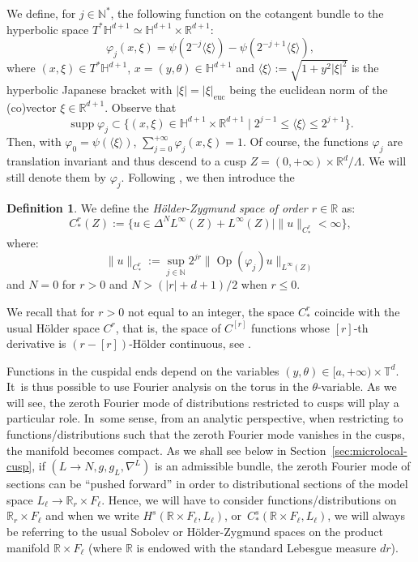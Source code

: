 \documentclass[10pt]{amsart}
\newcommand{\R}{\mathbb{R}}
\newcommand{\T}{\mathbb{T}}
\newcommand{\N}{\mathbb{N}}
\newcommand{\HH}{\mathbb{H}}
\DeclareMathOperator{\Op}{Op}
\DeclareMathOperator{\supp}{supp}
\theoremstyle{plain}
\theoremstyle{definition}
\newtheorem{definition}{Definition}[section]
\begin{document}
We define, for $j \in \N^\ast$, the following function on the cotangent bundle to the hyperbolic space $T^* \HH^{d+1} \simeq \HH^{d+1}\times \R^{d+1}$:
\begin{equation}
\label{equation:definition-phi-j}
\varphi_j(x,\xi) = \psi(2^{-j}\langle \xi \rangle)-\psi(2^{-j+1}\langle \xi \rangle),
\end{equation}
where $(x,\xi) \in T^*\HH^{d+1}$, $x = (y,\theta) \in \HH^{d+1}$ and $\langle \xi \rangle := \sqrt{1 + y^2|\xi|^2}$ is the hyperbolic Japanese bracket with $|\xi| = |\xi|_{\mathrm{euc}}$ being the euclidean norm of the (co)vector $\xi \in \R^{d+1}$. Observe that
\[
\supp \varphi_j \subset \bigl\{ (x,\xi) \in \HH^{d+1} \times \R^{d+1} \mid 2^{j-1} \leq \langle \xi \rangle \leq 2^{j+1}\bigr\}.
\]
Then, with $\varphi_0 = \psi(\langle \xi\rangle)$, $\sum_{j=0}^{+\infty} \varphi_j(x,\xi) = 1$. Of course, the functions $\varphi_j$ are translation invariant and thus descend to a cusp $Z = (0,+\infty) \times \R^d/\Lambda$. We will still denote them by $\varphi_j$. Following \cite[Def.\,3.1]{Bonthonneau-Lefeuvre-19-1}, we then introduce the

\begin{definition}
We define the \emph{Hölder-Zygmund space of order $r \in \R$} as:
\[
C^r_*(Z) := \bigl\{ u \in \Delta^N L^\infty(Z)+L^\infty(Z)\mid \|u\|_{C^r_*} < \infty \bigr\},
\]
where:
\[
\|u\|_{C^r_*} := \sup_{j \in \N} 2^{jr} \|\Op(\varphi_j)u\|_{L^\infty(Z)}
\]
and $N =0$ for $r>0$ and $N> (|r|+d+1)/2$ when $r\leq 0$.
\end{definition}

We recall that for $r > 0$ not equal to an integer, the space $C^r_*$ coincide with the usual Hölder space $C^r$, that is, the space of $C^{[r]}$ functions whose $[r]$-th derivative is $(r-[r])$-Hölder continuous, see \cite[Prop.\,3.2]{Bonthonneau-Lefeuvre-19-1}.

Functions in the cuspidal ends depend on the variables $(y,\theta) \in [a,+\infty) \times \T^d$. It~is thus possible to use Fourier analysis on the torus in the $\theta$-variable. As we will see, the zeroth Fourier mode of distributions restricted to cusps will play a particular role. In~some sense, from an analytic perspective, when restricting to functions/distributions such that the zeroth Fourier mode vanishes in the cusps, the manifold becomes compact. As we shall see below in Section~\ref{sec:microlocal-cusp}, if $(L\to N,g,g_L,\nabla^L)$ is an admissible bundle, the zeroth Fourier mode of sections can be ``pushed forward'' in order to distributional sections of the model space $L_\ell\to \R_r\times F_\ell$. Hence, we will have to consider functions/distributions on $\R_r \times F_\ell$ and when we write $H^s(\R\times F_\ell,L_\ell)$, or~$C^s_\ast(\R\times F_\ell, L_\ell)$, we will always be referring to the usual Sobolev or Hölder-Zygmund spaces on the product manifold $\R \times F_\ell$ (where $\R$ is endowed with the standard Lebesgue measure $dr$).
\end{document}
